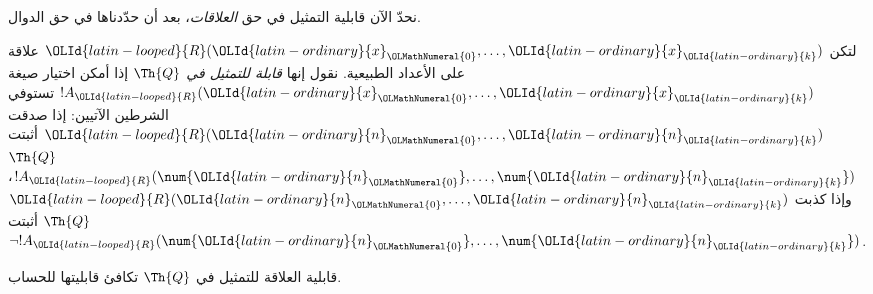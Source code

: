 \documentclass[../../../include/open-logic-section]{subfiles}
\begin{document}


نحدّ الآن قابلية التمثيل في حق \emph{العلاقات}، بعد أن حدّدناها في حق الدوال.

\begin{defn}
 لتكن
$\OLId{latin-looped}{R}(\OLId{latin-ordinary}{x}_\OLMathNumeral{0},\dots,\OLId{latin-ordinary}{x}_\OLId{latin-ordinary}{k})$ علاقة على الأعداد الطبيعية.
نقول إنها {\em قابلة للتمثيل في $\Th{Q}$} إذا أمكن اختيار صيغة
$!A_\OLId{latin-looped}{R}(\OLId{latin-ordinary}{x}_\OLMathNumeral{0},\dots,\OLId{latin-ordinary}{x}_\OLId{latin-ordinary}{k})$ تستوفي الشرطين الآتيين:
إذا صدقت $\OLId{latin-looped}{R}(\OLId{latin-ordinary}{n}_\OLMathNumeral{0},\dots,\OLId{latin-ordinary}{n}_\OLId{latin-ordinary}{k})$ أثبتت $\Th{Q}$
$!A_\OLId{latin-looped}{R}(\num{\OLId{latin-ordinary}{n}_\OLMathNumeral{0}},\dots,\num{\OLId{latin-ordinary}{n}_\OLId{latin-ordinary}{k}})$،
وإذا كذبت $\OLId{latin-looped}{R}(\OLId{latin-ordinary}{n}_\OLMathNumeral{0},\dots,\OLId{latin-ordinary}{n}_\OLId{latin-ordinary}{k})$ أثبتت $\Th{Q}$
$\lnot !A_\OLId{latin-looped}{R}(\num{\OLId{latin-ordinary}{n}_\OLMathNumeral{0}},\dots,\num{\OLId{latin-ordinary}{n}_\OLId{latin-ordinary}{k}})$.
\end{defn}

\begin{thm}
 قابلية العلاقة للتمثيل في
$\Th{Q}$ تكافئ قابليتها للحساب.
\end{thm}
\end{document}
